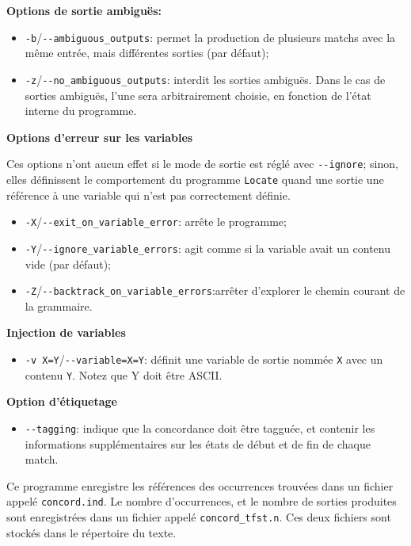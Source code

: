 \bigskip
\noindent \textbf{Options de sortie ambiguës:}
\begin{itemize}
  \item \verb+-b+/\verb+--ambiguous_outputs+: permet la production de plusieurs
   matchs avec la même entrée, mais différentes sorties (par défaut);
  \item \verb+-z+/\verb+--no_ambiguous_outputs+: interdit les sorties ambiguës. Dans
	le cas de sorties ambiguës, l'une sera arbitrairement choisie, en fonction de l'état interne
	du programme.
\end{itemize}

\bigskip
\noindent \textbf{Options d'erreur sur les variables}

\noindent Ces options n'ont aucun effet si le mode de sortie est réglé avec
\verb+--ignore+; sinon, elles définissent le comportement du programme \verb+Locate+ 
quand une sortie une référence à une variable qui n'est pas correctement définie.
\begin{itemize}
\item \verb+-X+/\verb+--exit_on_variable_error+: arrête le programme;
\item \verb+-Y+/\verb+--ignore_variable_errors+: agit comme si la variable avait
   un contenu vide (par défaut);
\item \verb+-Z+/\verb+--backtrack_on_variable_errors+:arrêter d'explorer le chemin courant de la
	grammaire.
\end{itemize}
\noindent \textbf{Injection de variables}
\begin{itemize}
\item \verb+-v X=Y+/\verb+--variable=X=Y+: définit une variable de sortie nommée \verb+X+ avec un contenu
  	  \verb+Y+.  
  Notez que Y doit être ASCII.
\end{itemize}
\noindent \textbf{Option d'étiquetage}
\begin{itemize}
\item \verb+--tagging+: indique que la concordance doit être tagguée, et contenir les
  informations supplémentaires sur les états de début et de fin de chaque match.
\end{itemize}
\bigskip
\noindent {}Ce
programme enregistre les références des occurrences trouvées dans un fichier appelé
\verb+concord.ind+. Le nombre d'occurrences, et le nombre de sorties produites sont enregistrées
dans un fichier appelé \verb+concord_tfst.n+. Ces deux fichiers sont stockés dans
le répertoire du texte.







